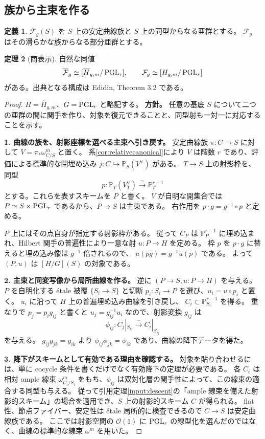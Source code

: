 \documentclass[dvipdfmx,a4paper,11pt]{article}
\theoremstyle{definition}
\newtheorem{thm}{定理}[section]
\newtheorem{dfn}[thm]{定義}
\newcommand{\PP}{\mathbb P}\newcommand{\HH}{\mathbb H}
\newcommand{\OO}{\mathcal O}\newcommand{\MM}{\mathcal M}\newcommand{\TT}{\mathcal T}
\begin{document}
\subsection{族から主束を作る}
\begin{dfn}
$\overline{\mathcal F}_g(S)$ を $S$ 上の安定曲線族と $S$ 上の同型からなる亜群とする。
$\mathcal F_g$ はその滑らかな族からなる部分亜群とする。
\end{dfn}
\begin{thm}[商表示]\label{thm:hilbertquotient}
自然な同値
\[
\overline{\mathcal F}_g\simeq[\overline H_{g,m}/\operatorname{PGL}_r],\qquad
\mathcal F_g\simeq[H_{g,m}/\operatorname{PGL}_r]
\]
がある。出典となる構成は Edidin, Theorem 3.2 である。
\end{thm}
\begin{proof}
$H=\overline H_{g,m}$、$G=\operatorname{PGL}_r$ と略記する。
\textbf{方針。} 任意の基底 $S$ について二つの亜群の間に関手を作り、対象を復元できることと、同型射も一対一に対応することを示す。

\textbf{1. 曲線の族を、射影座標を選べる主束へ引き戻す。}
安定曲線族 $\pi:C\to S$ に対して $V=\pi_*\omega_{C/S}^m$ と置く。
系\ref{cor:relativecanonical}により $V$ は階数 $r$ であり、評価による標準的な閉埋め込み
$j:C\hookrightarrow\PP_S(V^\vee)$ がある。
$T\to S$ 上の射影枠を、同型
\[
p:\PP_T(V_T^\vee)\xrightarrow{\sim}\PP^{r-1}_T
\]
とする。これらを表すスキームを $P$ と書く。
$V$ が自明な開集合では $P\simeq S\times\operatorname{PGL}_r$ であるから、$P\to S$ は主束である。
右作用を $p\cdot g=g^{-1}\circ p$ と定める。

$P$ 上にはその点自身が指定する射影枠がある。
従って $C_P$ は $\PP^{r-1}_P$ に埋め込まれ、Hilbert 関手の普遍性により一意な射 $u:P\to H$ を定める。
枠 $p$ を $p\cdot g$ に替えると埋め込み像は $g^{-1}$ 倍されるので、
$u(pg)=g^{-1}u(p)$ である。
よって $(P,u)$ は $[H/G](S)$ の対象である。

\textbf{2. 主束と同変写像から局所曲線を作る。}
逆に $(P\to S,u:P\to H)$ を与える。
$P$ を自明化する étale 被覆 $\{S_i\to S\}$ と切断 $p_i:S_i\to P$ を選び、$u_i=u\circ p_i$ と置く。
$u_i$ に沿って $H$ 上の普遍埋め込み曲線を引き戻し、
$C_i\subset\PP^{r-1}_{S_i}$ を得る。
重なりで $p_j=p_i g_{ij}$ と書くと $u_j=g_{ij}^{-1}u_i$ なので、射影変換 $g_{ij}$ は
\[
\phi_{ij}:C_j|_{S_{ij}}\xrightarrow{\sim}C_i|_{S_{ij}}
\]
を与える。
$g_{ij}g_{jk}=g_{ik}$ より $\phi_{ij}\phi_{jk}=\phi_{ik}$ であり、曲線の降下データを得た。

\textbf{3. 降下がスキームとして有効である理由を確認する。}
対象を貼り合わせるには、単に cocycle 条件を書くだけでなく有効降下の定理が必要である。
各 $C_i$ は相対 ample 線束 $\omega_{C_i/S_i}^m$ をもち、$\phi_{ij}$ は双対化層の関手性によって、この線束の適合する同型も与える。
従って引用定理\ref{input:descent}の「ample 線束を備えた射影的スキーム」の場合を適用でき、$S$ 上の射影的スキーム $C$ が得られる。
flat 性、節点ファイバー、安定性は étale 局所的に検査できるので $C\to S$ は安定曲線族である。
ここでは射影空間の $\OO(1)$ に $\operatorname{PGL}_r$ の線型化を選んだのではなく、曲線の標準的な線束 $\omega^m$ を用いた。


\end{proof}
\end{document}
